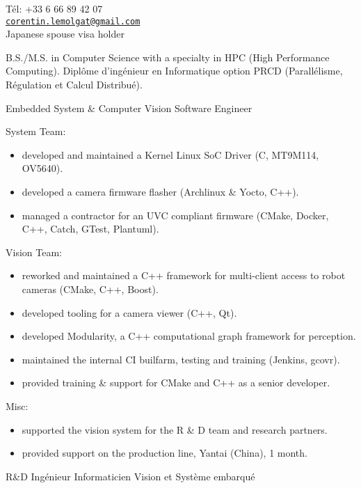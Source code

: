 \documentclass{article}
\begin{document}


T\'{e}l: +33 6 66 89 42 07\\
\href{mailto:corentin.lemolgat@gmail.com}{\texttt{corentin.lemolgat@gmail.com}}\\
Japanese spouse visa holder\\

\begin{llist}
 
 {
B.S./M.S. in Computer Science with a specialty in HPC (High Performance Computing).
} {
Dipl\^{o}me d'ing\'{e}nieur en Informatique option PRCD (Parall\'{e}lisme,
R\'{e}gulation et Calcul Distribu\'{e}).
}

{}
{}
\vspace{-0.33cm}

 {
Embedded System \& Computer Vision Software Engineer \\
\vspace{-0.33cm}

System Team:
\vspace{-0.33cm}
\begin{itemize}
\item developed and maintained a Kernel Linux SoC Driver (C, MT9M114, OV5640).
\item developed a camera firmware flasher (Archlinux \& Yocto, C++).
\item managed a contractor for an UVC compliant firmware (CMake, Docker, C++, Catch, GTest, Plantuml).
\end{itemize}
Vision Team:
\vspace{-0.33cm}
\begin{itemize}
\item reworked and maintained a C++ framework for multi-client access to robot cameras (CMake, C++, Boost).
\item developed tooling for a camera viewer (C++, Qt).
\item developed Modularity, a C++ computational graph framework for perception.
\item maintained the internal CI builfarm, testing and training (Jenkins,
 gcovr).
\item provided training \& support for CMake and C++ as a senior developer.
\end{itemize}
Misc:
\vspace{-0.33cm}
\begin{itemize}
\item supported the vision system for the R \& D team and research partners.
\item provided support on the production line, Yantai (China), 1 month.
\end{itemize}
}{
R\&D Ing\'{e}nieur Informaticien Vision et Syst\`{e}me embarqu\'{e}
\vspace{-0.33cm}

}
\end{llist}
\end{document}
